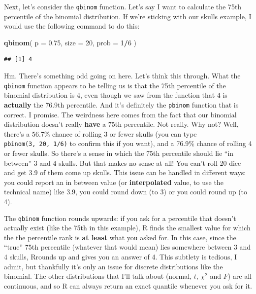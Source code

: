 \documentclass[
]{book}
\newenvironment{Shaded}{\begin{snugshade}}{\end{snugshade}}
\newcommand{\AttributeTok}[1]{\textcolor[rgb]{0.13,0.29,0.53}{#1}}
\newcommand{\DecValTok}[1]{\textcolor[rgb]{0.00,0.00,0.81}{#1}}
\newcommand{\FloatTok}[1]{\textcolor[rgb]{0.00,0.00,0.81}{#1}}
\newcommand{\FunctionTok}[1]{\textcolor[rgb]{0.13,0.29,0.53}{\textbf{#1}}}
\newcommand{\NormalTok}[1]{#1}
\newcommand{\SpecialCharTok}[1]{\textcolor[rgb]{0.81,0.36,0.00}{\textbf{#1}}}
\begin{document}
Next, let's consider the \texttt{qbinom} function. Let's say I want to calculate the 75th percentile of the binomial distribution. If we're sticking with our skulls example, I would use the following command to do this:

\begin{Shaded}
\begin{Highlighting}[]
\FunctionTok{qbinom}\NormalTok{( }\AttributeTok{p =} \FloatTok{0.75}\NormalTok{, }\AttributeTok{size =} \DecValTok{20}\NormalTok{, }\AttributeTok{prob =} \DecValTok{1}\SpecialCharTok{/}\DecValTok{6}\NormalTok{ )}
\end{Highlighting}
\end{Shaded}

\begin{verbatim}
## [1] 4
\end{verbatim}

Hm. There's something odd going on here. Let's think this through. What the \texttt{qbinom} function appears to be telling us is that the 75th percentile of the binomial distribution is 4, even though we saw from the function that 4 is \textbf{actually} the 76.9th percentile. And it's definitely the \texttt{pbinom} function that is correct. I promise. The weirdness here comes from the fact that our binomial distribution doesn't really \textbf{have} a 75th percentile. Not really. Why not? Well, there's a 56.7\% chance of rolling 3 or fewer skulls (you can type \texttt{pbinom(3,\ 20,\ 1/6)} to confirm this if you want), and a 76.9\% chance of rolling 4 or fewer skulls. So there's a sense in which the 75th percentile should lie ``in between'' 3 and 4 skulls. But that makes no sense at all! You can't roll 20 dice and get 3.9 of them come up skulls. This issue can be handled in different ways: you could report an in between value (or \textbf{interpolated} value, to use the technical name) like 3.9, you could round down (to 3) or you could round up (to 4).

The \texttt{qbinom} function rounds upwards: if you ask for a percentile that doesn't actually exist (like the 75th in this example), R finds the smallest value for which the the percentile rank is \textbf{at least} what you asked for. In this case, since the ``true'' 75th percentile (whatever that would mean) lies somewhere between 3 and 4 skulls, Rrounds up and gives you an answer of 4. This subtlety is tedious, I admit, but thankfully it's only an issue for discrete distributions like the binomial. The other distributions that I'll talk about (normal, \(t\), \(\chi^2\) and \(F\)) are all continuous, and so R can always return an exact quantile whenever you ask for it.
\end{document}
